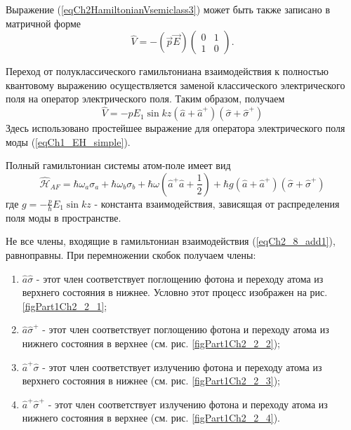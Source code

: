 Выражение (\ref{eqCh2HamiltonianVsemiclass3}) может быть также
записано в матричной форме 
\begin{equation}
\hat{V} = - \left(\vec{p} \vec{E}\right)
\left(
\begin{array} {cc}
0 & 1  
\\
1 & 0 
\end{array}
\right).
\label{eqCh2_8}
\end{equation}

Переход от полуклассического гамильтониана взаимодействия к полностью
квантовому выражению осуществляется заменой классического
электрического поля на оператор электрического поля. Таким
образом, получаем 
\begin{equation}
\hat{V} = - p E_1 \sin k z \left(\hat{a} + \hat{a}^{+}\right)
\left(\hat{\sigma} + \hat{\sigma}^{+}\right)
\label{eqCh2_8_add1}
\end{equation}
Здесь использовано простейшее выражение для оператора электрического
поля моды (\ref{eqCh1_EH_simple}). 

Полный гамильтониан системы атом-поле имеет вид
\begin{equation}
\hat{\mathcal{H}}_{AF} = 
\hbar \omega_a \sigma_a + \hbar \omega_b \sigma_b +
\hbar \omega 
\left(\hat{a}^{+}\hat{a} + \frac{1}{2}\right)
+ \hbar g \left(\hat{a} + \hat{a}^{+}\right)
\left(\hat{\sigma} + \hat{\sigma}^{+}\right)
\nonumber
\end{equation}
где $g = -\frac{p}{\hbar}E_1 \sin k z$ - константа взаимодействия,
зависящая от распределения поля моды в пространстве.  










Не все члены, входящие в гамильтониан взаимодействия
(\ref{eqCh2_8_add1}), равноправны. При перемножении скобок получаем
члены: 
\begin{enumerate}
\item $\hat{a}\hat{\sigma}$ - этот член соответствует поглощению
  фотона и переходу атома из верхнего состояния в нижнее. Условно этот
  процесс изображен на рис. \ref{figPart1Ch2_2_1};  
\item $\hat{a}\hat{\sigma}^{+}$ - этот член соответствует поглощению
  фотона и переходу атома из нижнего состояния в верхнее (см. рис. \ref{figPart1Ch2_2_2});  
\item $\hat{a}^{+}\hat{\sigma}$ - этот член соответствует излучению
  фотона и переходу атома из верхнего состояния в нижнее (см. рис. \ref{figPart1Ch2_2_3}); 
\item $\hat{a}^{+}\hat{\sigma}^{+}$ - этот член соответствует
  излучению фотона и переходу атома из нижнего состояния в верхнее (см. рис. \ref{figPart1Ch2_2_4}). 
\end{enumerate}


